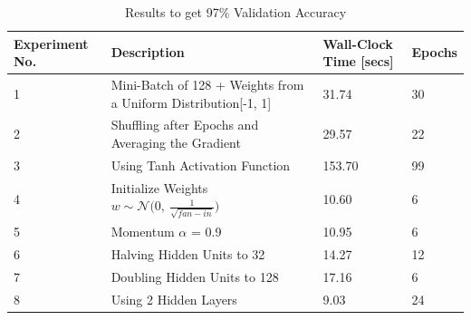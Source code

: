 \documentclass{article} %
\begin{document}
{{\renewcommand{\arraystretch}{1.5}
\begin{table}[h!]
\centering
\caption{Results to get 97\% Validation Accuracy}
\label{my-label}
\begin{tabular}{|p{2cm}|p{6cm}|p{2cm}|p{1.5cm}|}
\hline
\textbf{Experiment No.}            & \textbf{Description}                                                          & \textbf{Wall-Clock Time [secs]} & \textbf{Epochs} \\ \hline
1 & Mini-Batch of 128 + Weights from a Uniform Distribution{[}-1, 1{]} & 31.74                                              & 30                                  \\ \hline
2 & Shuffling after Epochs and Averaging the Gradient                                         & 29.57                                              & 22                                  \\ \hline
3 & Using Tanh Activation Function                                                            & 153.70                                             & 99                                  \\ \hline
4 & Initialize Weights $w \sim \mathcal{N} \bigg(0, \  \frac{1}{\sqrt{fan-in}} \bigg)     $ & 10.60                                              & 6                                   \\ \hline
5 & Momentum $\alpha$ = 0.9                                                                     & 10.95                                              & 6                                   \\ \hline
6 & Halving Hidden Units to 32                                                                & 14.27                                              & 12                                  \\ \hline
7 & Doubling Hidden Units to 128                                                              & 17.16                                              & 6                                   \\ \hline
8 & Using 2 Hidden Layers                                                                     & 9.03                                               & 24                                    \\ \hline
\end{tabular}
\end{table}

}}
\end{document}
